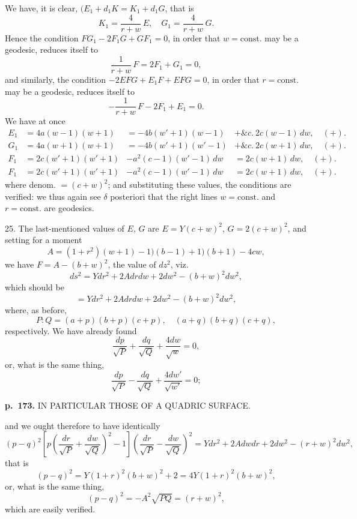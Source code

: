 \documentclass[11pt,a4paper]{article}
\begin{document}
We have, it is clear, $(E_1 + d_1 K = K_1 + d_1 G$, that is
\[
K_1 = \frac{4}{r+w}\, E, \quad G_1 = \frac{4}{r+w}\, G.
\]
Hence the condition $F G_1 - 2 F_1 G + G F_1 = 0$, in order that $w = \mathrm{const.}$ may be a geodesic, reduces itself to
\[
\frac{1}{r+w}\, F = 2 F_1 + G_1 = 0,
\]
and similarly, the condition $-2E F G + E_1 F + E F G = 0$, in order that $r = \mathrm{const.}$ may be a geodesic, reduces itself to
\[
-\frac{1}{r+w}\, F - 2F_1 + E_1 = 0.
\]
We have at once
\begin{align*}
E_1 &= 4a(w - 1)(w + 1)  &= -4b(w' + 1)(w - 1)  &+ \&c.\ 2c(w - 1)\,dw,  \quad (+).
\\
G_1 &= 4a(w + 1)(w + 1)  &= -4b(w' + 1)(w' - 1)  &+ \&c.\ 2c(w + 1)\,dw,  \quad (+).
\\
F_1 &= 2c(w' + 1)(w' + 1)  &- a^2(c - 1)(w' - 1)\, dw  &= 2c(w + 1)\,dw,  \quad (+).
\\
F_1 &= 2c(w' + 1)(w' + 1)  &- a^2(c - 1)(w' - 1)\, dw  &= 2c(w + 1)\,dw,  \quad (+).
\end{align*}
where denom. $=(c+w)^2$; and substituting these values, the conditions are verified: we thus again see $\delta$ posteriori that the right lines $w = \mathrm{const.}$ and $r = \mathrm{const.}$ are geodesics.

25. The last-mentioned values of $E$, $G$ are $E = Y(c+w)^2$, $G = 2(c+w)^2$, and setting for a moment
\[
A = (1 + r^2)(w + 1) - 1)(b - 1) + 1)(b + 1) - 4cw,
\]
we have $F = A - (b + w)^2$, the value of $dz^2$, viz.
\[
ds^2 = Y dr^2 + 2A dr dw + 2dw^2 - (b + w)^2 dw^2,
\]
which should be
\[
= Y dr^2 + 2A dr dw + 2dw^2 - (b + w)^2 dw^2,
\]
where, as before,
\[
P : Q = (a + p)(b + p)(c + p), \quad (a + q)(b + q)(c + q),
\]
respectively.  We have already found
\[
\frac{dp}{\sqrt{P}} + \frac{dq}{\sqrt{Q}} + \frac{4 dw}{\sqrt{w}} = 0,
\]
or, what is the same thing,
\[
\frac{dp}{\sqrt{P}} - \frac{dq}{\sqrt{Q}} + \frac{4 dw'}{\sqrt{w'}} = 0;
\]

\clearpage

\noindent
\textbf{p.~173.}  IN PARTICULAR THOSE OF A QUADRIC SURFACE.

and we ought therefore to have identically
\[
(p - q)^2 \left[ p \left( \frac{dr}{\sqrt{P}} + \frac{dw}{\sqrt{Q}} \right)^2 - 1 \right] \left( \frac{dr}{\sqrt{P}} - \frac{dw}{\sqrt{Q}} \right)^2 = Ydr^2 + 2Adwdr + 2dw^2 - (r+w)^2 dw^2,
\]
that is
\[
(p - q)^2 = Y(1 + r)^2(b + w)^2 + 2 = 4Y(1 + r)^2(b + w)^2,
\]
or, what is the same thing,
\[
(p - q)^2 = -A^2 \sqrt{P Q} = (r + w)^2,
\]
which are easily verified.
\end{document}
